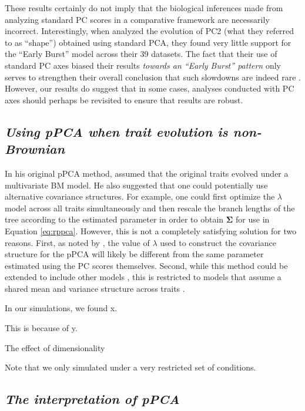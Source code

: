 \documentclass[a4paper,12pt]{article}
\begin{document}
These results certainly do not imply that the biological inferences made from analyzing standard PC scores in a comparative framework are necessarily incorrect.  
Interestingly, when \citet{Harmon2010} analyzed the evolution of PC2 (what they referred to as ``shape'') obtained using standard PCA, they found very little support for the ``Early Burst'' model \citep{Blomberg2003} across their 39 datasets. The fact that their use of standard PC axes biased their results \emph{towards an ``Early Burst'' pattern} only serves to strengthen their overall conclusion that such slowdowns are indeed rare \citep[but see][]{SlaterPennell}. However, our results do suggest that in some cases, analyses conducted with PC axes should perhaps be revisited to ensure that results are robust.

\subsection{\emph{Using pPCA when trait evolution is non-Brownian}}
In his original pPCA method, \citet{Revell2008} assumed that the original traits evolved under a multivariate BM model. He also suggested that one could potentially use alternative covariance structures. For example, one could first optimize the $\lambda$ model \citep{Pagel1999} across all traits simultaneously \citep[using the method of][]{Freckleton2002} and then rescale the branch lengths of the tree according to the estimated parameter in order to obtain $\mathbf{\Sigma}$ for use in Equation \ref{eq:rppca}. However, this is not a completely satisfying solution for two reasons. First, as noted by \citet{Revell2008}, the value of $\lambda$ used to construct the covariance structure for the pPCA will likely be different from the same parameter estimated using the PC scores themselves. Second, while this method could be extended to include other models \citep{ButlerKing2009, motmot}, this is restricted to models that assume a shared mean and variance structure across traits \citep[see][for examples where this does not  apply]{Hansen2008, Bartoszek2012}.

In our simulations, we found x.

This is because of y.

The effect of dimensionality

Note that we only simulated under a very restricted set of conditions.

\subsection{\emph{The interpretation of pPCA}}
\end{document}
